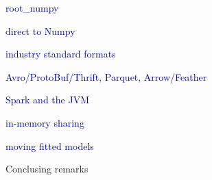\documentclass{beamer}
\begin{document}
\begin{frame}{}
\begin{center}
\LARGE \textcolor{darkblue}{root\_numpy}
\end{center}
\end{frame}

\begin{frame}{}
\begin{center}
\LARGE \textcolor{darkblue}{direct to Numpy}
\end{center}
\end{frame}

\begin{frame}{}
\begin{center}
\LARGE \textcolor{darkblue}{industry standard formats}

\vspace{0.25 cm}
\textcolor{darkblue}{\Large Avro/ProtoBuf/Thrift, Parquet, Arrow/Feather}
\end{center}
\end{frame}

\begin{frame}{}
\begin{center}
\LARGE \textcolor{darkblue}{Spark and the JVM}
\end{center}
\end{frame}

\begin{frame}{}
\begin{center}
\LARGE \textcolor{darkblue}{in-memory sharing}
\end{center}
\end{frame}

\begin{frame}{}
\begin{center}
\LARGE \textcolor{darkblue}{moving fitted models}
\end{center}
\end{frame}

\begin{frame}{Conclusing remarks}

\end{frame}
\end{document}
